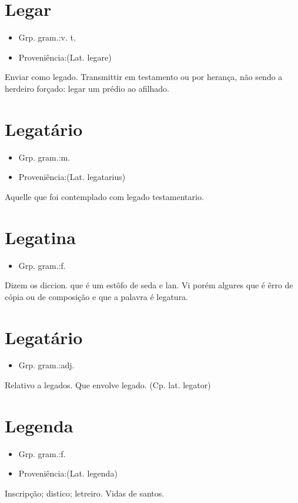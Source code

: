 \section{Legar}
\begin{itemize}
\item {Grp. gram.:v. t.}
\end{itemize}
\begin{itemize}
\item {Proveniência:(Lat. \textunderscore legare\textunderscore )}
\end{itemize}
Enviar como legado.
Transmittir em testamento ou por herança, não sendo a herdeiro forçado: \textunderscore legar um prédio ao afilhado\textunderscore .
\section{Legatário}
\begin{itemize}
\item {Grp. gram.:m.}
\end{itemize}
\begin{itemize}
\item {Proveniência:(Lat. \textunderscore legatarius\textunderscore )}
\end{itemize}
Aquelle que foi contemplado com legado testamentario.
\section{Legatina}
\begin{itemize}
\item {Grp. gram.:f.}
\end{itemize}
Dizem os diccion. que é um estôfo de seda e lan. Vi porém algures que é êrro de cópia ou de composição e que a palavra é \textunderscore legatura\textunderscore .
\section{Legatário}
\begin{itemize}
\item {Grp. gram.:adj.}
\end{itemize}
Relativo a legados.
Que envolve legado.
(Cp. lat. \textunderscore legator\textunderscore )
\section{Legenda}
\begin{itemize}
\item {Grp. gram.:f.}
\end{itemize}
\begin{itemize}
\item {Proveniência:(Lat. \textunderscore legenda\textunderscore )}
\end{itemize}
Inscripção; distico; letreiro.
Vidas de santos.
